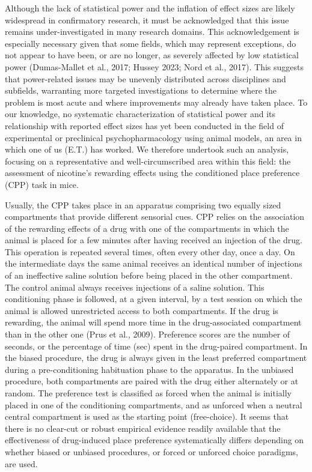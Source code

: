 \documentclass[authordate, meta]{jote-new-article}
\begin{document}
	Although the lack of statistical power and the inflation of effect sizes are likely widespread in confirmatory research, it must be acknowledged that this issue remains under-investigated in many research domains. This acknowledgement is especially necessary given that some fields, which may represent exceptions, do not appear to have been, or are no longer, as severely affected by low statistical power (Dumas-Mallet et al., 2017; Hussey 2023; Nord et al., 2017). This suggests that power-related issues may be unevenly distributed across disciplines and subfields, warranting more targeted investigations to determine where the problem is most acute and where improvements may already have taken place. To our knowledge, no systematic characterization of statistical power and its relationship with reported effect sizes has yet been conducted in the field of experimental or preclinical psychopharmacology using animal models, an area in which one of us (E.T.) has worked. We therefore undertook such an analysis, focusing on a representative and well-circumscribed area within this field: the assessment of nicotine's rewarding effects using the conditioned place preference (CPP) task in mice.



	Usually, the CPP takes place in an apparatus comprising two equally sized compartments that provide different sensorial cues. CPP relies on the association of the rewarding effects of a drug with one of the compartments in which the animal is placed for a few minutes after having received an injection of the drug. This operation is repeated several times, often every other day, once a day. On the intermediate days the same animal receives an identical number of injections of an ineffective saline solution before being placed in the other compartment. The control animal always receives injections of a saline solution. This conditioning phase is followed, at a given interval, by a test session on which the animal is allowed unrestricted access to both compartments. If the drug is rewarding, the animal will spend more time in the drug-associated compartment than in the other one (Prus et al., 2009). Preference scores are the number of seconds, or the percentage of time (sec) spent in the drug-paired compartment. In the biased procedure, the drug is always given in the least preferred compartment during a pre-conditioning habituation phase to the apparatus. In the unbiased procedure, both compartments are paired with the drug either alternately or at random. The preference test is classified as forced when the animal is initially placed in one of the conditioning compartments, and as unforced when a neutral central compartment is used as the starting point (free-choice). It seems that there is no clear-cut or robust empirical evidence readily available that the effectiveness of drug-induced place preference systematically differs depending on whether biased or unbiased procedures, or forced or unforced choice paradigms, are used.
\end{document}
